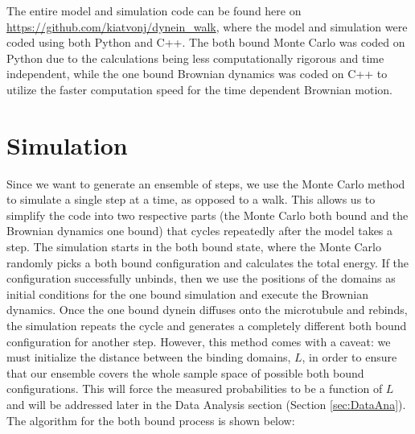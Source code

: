 
The entire model and simulation code can be found here on \url{https://github.com/kiatvonj/dynein_walk}, where the model and simulation were coded using both Python and C++. The both bound Monte Carlo was coded on Python due to the calculations being less computationally rigorous and time independent, while the one bound Brownian dynamics was coded on C++ to utilize the faster computation speed for the time  dependent Brownian motion.

\section{Simulation}
Since we want to generate an ensemble of steps, we use the Monte Carlo method to simulate a single step at a time, as opposed to a walk. This allows us to simplify the code into two respective parts (the Monte Carlo both bound and the Brownian dynamics one bound) that cycles repeatedly after the model takes a step. The simulation starts in the both bound state, where the Monte Carlo randomly picks a both bound configuration and calculates the total energy. If the configuration successfully unbinds, then we use the positions of the domains as initial conditions for the one bound simulation and execute the Brownian dynamics. Once the one bound dynein diffuses onto the microtubule and rebinds, the simulation repeats the cycle and generates a completely different both bound configuration for another step. However, this method comes with a caveat: we must initialize the distance between the binding domains, $L$, in order to ensure that our ensemble covers the whole sample space of possible both bound configurations. This will force the measured probabilities to be a function of $L$ and will be addressed later in the Data Analysis section (Section \ref{sec:DataAna}). The algorithm for the both bound process is shown below:

